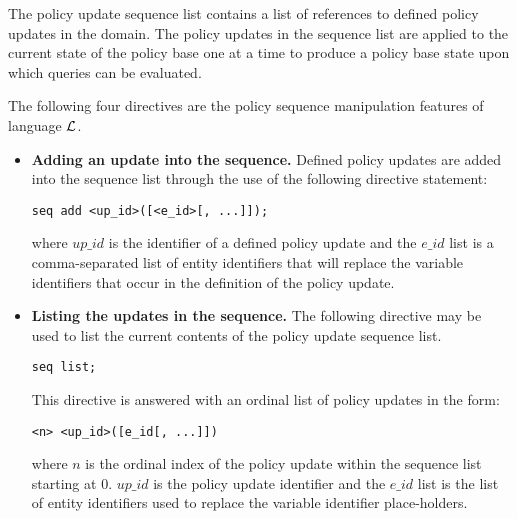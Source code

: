 \documentclass{llncs}
\begin{document}
        The policy update sequence list contains a list of references to
        defined policy updates in the domain. The policy updates in the
        sequence list are applied to the current state of the policy base one
        at a time to produce a policy base state upon which queries can be
        evaluated.

        The following four directives are the policy sequence manipulation
        features of language $\cal{L}$.

        \begin{itemize}
          \item
            {\bf Adding an update into the sequence.} Defined policy updates
            are added into the sequence list through the use of the following
            directive statement:

            \begin{verbatim}seq add <up_id>([<e_id>[, ...]]);\end{verbatim}
                                                                              
            \noindent where $up\_id$ is the identifier of a defined policy
            update and the $e\_id$ list is a comma-separated list of entity
            identifiers that will replace the variable identifiers that occur
            in the definition of the policy update.

          \vspace{1mm}
          \item
            {\bf Listing the updates in the sequence.} The following
            directive may be used to list the current contents of the policy
            update sequence list.
                                                                              
            \begin{verbatim}seq list;\end{verbatim}
                                                                              
            This directive is answered with an ordinal list of policy
            updates in the form:
                                                                              
            \begin{verbatim}<n> <up_id>([e_id[, ...]])\end{verbatim}

            \noindent where $n$ is the ordinal index of the policy update
            within the sequence list starting at 0. $up\_id$ is the policy
            update identifier and the $e\_id$ list is the list of entity
            identifiers used to replace the variable identifier
            place-holders.


\end{itemize}
\end{document}
